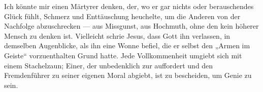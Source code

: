Ich könnte mir einen Märtyrer denken, der, wo er gar nichts oder berauschendes Glück fühlt, Schmerz und Enttäuschung heuchelte, um die Anderen von der Nachfolge abzuschrecken — aus Missgunst, aus Hochmuth, ohne den kein höherer Mensch zu denken ist. Vielleicht schrie Jesus, dass Gott ihn verlassen, in demselben Augenblicke, als ihn eine Wonne befiel, die er selbst den „Armen im Geiste“ vorzuenthalten Grund hatte. Jede Vollkommenheit umgiebt sich mit einem Stachelzaun; Einer, der unbedenklich zur  auffordert und den Fremdenführer zu seiner eigenen Moral abgiebt, ist zu bescheiden, um Genie zu sein.
\par

